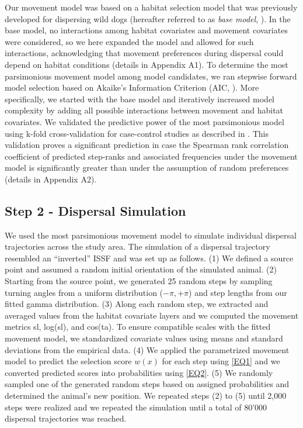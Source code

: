 \documentclass[abstract=on,10pt,a4paper,bibliography=totocnumbered]{article}
\begin{document}
Our movement model was based on a habitat selection model that was previously
developed for dispersing wild dogs (hereafter referred to as \textit{base
model}, \citealp{Hofmann.2021}). In the base model, no interactions among
habitat covariates and movement covariates were considered, so we here expanded
the model and allowed for such interactions, acknowledging that movement
preferences during dispersal could depend on habitat conditions (details in
Appendix A1). To determine the most parsimonious movement model among model
candidates, we ran stepwise forward model selection based on Akaike's
Information Criterion (AIC, \citealp{Burnham.2002}). More specifically, we
started with the base model and iteratively increased model complexity by adding
all possible interactions between movement and habitat covariates. We validated
the predictive power of the most parsimonious model using k-fold
cross-validation for case-control studies as described in \cite{Fortin.2009}.
This validation proves a significant prediction in case the Spearman rank
correlation coefficient of predicted step-ranks and associated frequencies under
the movement model is significantly greater than under the assumption of random
preferences (details in Appendix A2).

\subsection{Step 2 - Dispersal Simulation}
We used the most parsimonious movement model to simulate individual dispersal
trajectories across the study area. The simulation of a dispersal trajectory
resembled an ``inverted'' ISSF and was set up as follows. (1) We defined a
source point and assumed a random initial orientation of the simulated animal.
(2) Starting from the source point, we generated 25 random steps by sampling
turning angles from a uniform distribution (\(-\pi, +\pi\)) and step lengths
from our fitted gamma distribution. (3) Along each random step, we extracted and
averaged values from the habitat covariate layers and we computed the movement
metrics \textsf{sl}, \textsf{log(sl)}, and \textsf{cos(ta)}. To ensure
compatible scales with the fitted movement model, we standardized covariate
values using means and standard deviations from the empirical data. (4) We
applied the parametrized movement model to predict the selection score \(w(x)\)
for each step using \ref{EQ1} and we converted predicted scores into
probabilities using \ref{EQ2}. (5) We randomly sampled one of the generated
random steps based on assigned probabilities and determined the animal's new
position. We repeated steps (2) to (5) until 2,000 steps were realized and we
repeated the simulation until a total of 80'000 dispersal trajectories was
reached.
\end{document}
